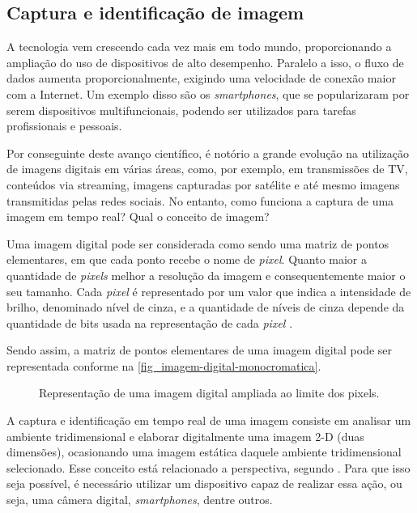 \subsection{Captura e identificação de imagem}

A tecnologia vem crescendo cada vez mais em todo mundo, proporcionando a ampliação do uso de dispositivos de alto desempenho. Paralelo a isso, o fluxo de dados aumenta proporcionalmente, exigindo uma velocidade de conexão maior com a Internet. Um exemplo disso são os \textit{smartphones}, que se popularizaram por serem dispositivos multifuncionais, podendo ser utilizados para tarefas profissionais e pessoais. 

Por conseguinte deste avanço científico, é notório a grande evolução na utilização de imagens digitais em várias áreas, como, por exemplo, em transmissões de TV, conteúdos via streaming, imagens capturadas por satélite e até mesmo imagens transmitidas pelas redes sociais. No entanto, como funciona a captura de uma imagem em tempo real? Qual o conceito de imagem?

Uma imagem digital pode ser considerada como sendo uma matriz de pontos elementares, em que cada ponto recebe o nome de \textit{pixel}. Quanto maior a quantidade de \textit{pixels} melhor a resolução da imagem e consequentemente maior o seu tamanho. Cada \textit{pixel} é representado por um valor que indica a intensidade de brilho, denominado nível de cinza, e a quantidade de níveis de cinza depende da quantidade de bits usada na representação de cada \textit{pixel} \cite{SOUZA2007}.

Sendo assim, a matriz de pontos elementares de uma imagem digital pode ser representada conforme na \autoref{fig_imagem-digital-monocromatica}.

\begin{figure}[h]
	\caption{\label{fig_imagem-digital-monocromatica}Representação de uma imagem digital ampliada ao limite dos pixels.}
	\begin{center}
	\end{center}
	\centering {}
\end{figure}

A captura e identificação em tempo real de uma imagem consiste em analisar um ambiente tridimensional e elaborar digitalmente uma imagem 2-D (duas dimensões), ocasionando uma imagem estática daquele ambiente tridimensional selecionado. Esse conceito está relacionado a perspectiva, segundo . Para que isso seja possível, é necessário utilizar um dispositivo capaz de realizar essa ação, ou seja, uma câmera digital, \textit{smartphones}, dentre outros.

